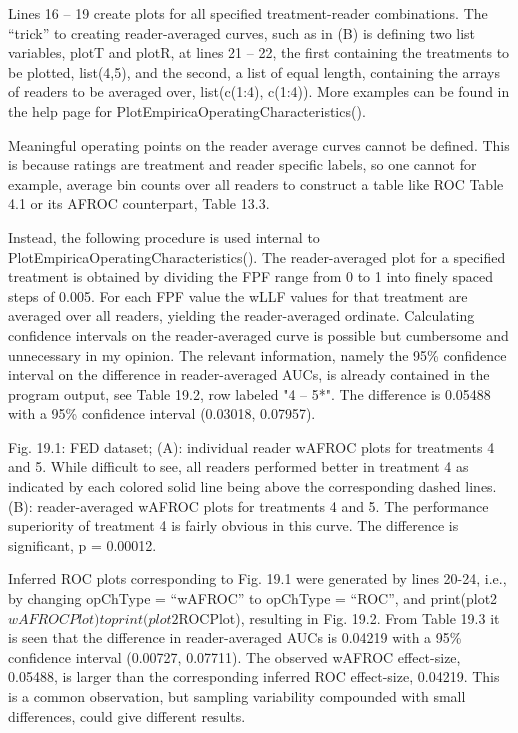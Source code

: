 \documentclass[
]{book}
\begin{document}
Lines 16 -- 19 create plots for all specified treatment-reader combinations. The ``trick'' to creating reader-averaged curves, such as in (B) is defining two list variables, plotT and plotR, at lines 21 -- 22, the first containing the treatments to be plotted, list(4,5), and the second, a list of equal length, containing the arrays of readers to be averaged over, list(c(1:4), c(1:4)). More examples can be found in the help page for PlotEmpiricaOperatingCharacteristics().

Meaningful operating points on the reader average curves cannot be defined. This is because ratings are treatment and reader specific labels, so one cannot for example, average bin counts over all readers to construct a table like ROC Table 4.1 or its AFROC counterpart, Table 13.3.

Instead, the following procedure is used internal to PlotEmpiricaOperatingCharacteristics(). The reader-averaged plot for a specified treatment is obtained by dividing the FPF range from 0 to 1 into finely spaced steps of 0.005. For each FPF value the wLLF values for that treatment are averaged over all readers, yielding the reader-averaged ordinate. Calculating confidence intervals on the reader-averaged curve is possible but cumbersome and unnecessary in my opinion. The relevant information, namely the 95\% confidence interval on the difference in reader-averaged AUCs, is already contained in the program output, see Table 19.2, row labeled "4 -- 5*". The difference is 0.05488 with a 95\% confidence interval (0.03018, 0.07957).

Fig. 19.1: FED dataset; (A): individual reader wAFROC plots for treatments 4 and 5. While difficult to see, all readers performed better in treatment 4 as indicated by each colored solid line being above the corresponding dashed lines. (B): reader-averaged wAFROC plots for treatments 4 and 5. The performance superiority of treatment 4 is fairly obvious in this curve. The difference is significant, p = 0.00012.

Inferred ROC plots corresponding to Fig. 19.1 were generated by lines 20-24, i.e., by changing opChType = ``wAFROC'' to opChType = ``ROC'', and print(plot2\(wAFROCPlot) to print(plot2\)ROCPlot), resulting in Fig. 19.2. From Table 19.3 it is seen that the difference in reader-averaged AUCs is 0.04219 with a 95\% confidence interval (0.00727, 0.07711). The observed wAFROC effect-size, 0.05488, is larger than the corresponding inferred ROC effect-size, 0.04219. This is a common observation, but sampling variability compounded with small differences, could give different results.
\end{document}
